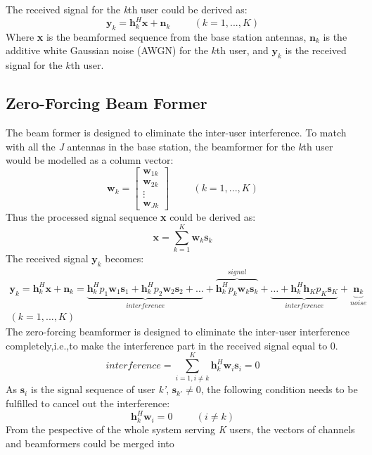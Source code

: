 \documentclass{article}
\begin{document}
\noindent
The received signal for the \textit{k}th user could be derived as:
\[
\textbf{y}_k = \textbf{h}_k^H\textbf{x}+\textbf{n}_k \hspace{1cm}(k = 1,...,K)
\]
Where \textbf{x} is the beamformed sequence from the base station antennas,
$\textbf{n}_k$ is the additive white Gaussian noise (AWGN) for the $\textit{k}$th user,
and $\textbf{y}_k$ is the received signal for the $\textit{k}$th user.

\subsection{Zero-Forcing Beam Former}
The beam former is designed to eliminate the inter-user interference.
To match with all the \textit{J} antennas in the base station,
the beamformer for the \textit{k}th user would be modelled as a column vector:
\[
\textbf{w}_k
=
\begin{bmatrix}
    \textbf{w}_{1k} \\
    \textbf{w}_{2k} \\
    \vdots \\
    \textbf{w}_{Jk}
\end{bmatrix} \hspace{1cm}(k = 1,...,K)
\]
Thus the processed signal sequence \textbf{x} could be derived as:
\[
\textbf{x} = \sum_{k=1}^{K}\textbf{w}_k\textbf{s}_k
\]
The received signal $\textbf{y}_k$ becomes:
\[
\begin{split}
\textbf{y}_k = \textbf{h}_k^H\textbf{x}+\textbf{n}_k = \underbrace{
\textbf{h}_k^{H}p_1\textbf{w}_1\textbf{s}_1 +\textbf{h}_k^Hp_2\textbf{w}_2\textbf{s}_2
+\dots}_{interference}+\overbrace{\textbf{h}_k^Hp_k\textbf{w}_k\textbf{s}_k}^{signal}+
\underbrace{\dots+\textbf{h}_k^H\textbf{h}_Kp_K\textbf{s}_K}_{interference} +\underbrace{\textbf{n}_k}_{noise} \\
(k = 1,...,K)
\end{split}
\]
The zero-forcing beamformer is designed to eliminate the inter-user interference completely,i.e.,to make the interference part in the received signal equal to 0.
\[
\textit{interference} = \sum_{i = 1,i\neq k}^{K}\textbf{h}_k^H\textbf{w}_{i}\textbf{s}_{i} = 0
\]
As $\textbf{s}_{i}$ is the signal sequence of user \textit{k'}, $\textbf{s}_{k'} \neq 0$, the following condition needs to be fulfilled to cancel out the interference:
\[
\textbf{h}_k^H\textbf{w}_{i} = 0 \hspace{1cm}(i \neq k)
\]
From the pespective of the whole system serving \textit{K} users, the vectors of channels and beamformers could be merged into
\end{document}
